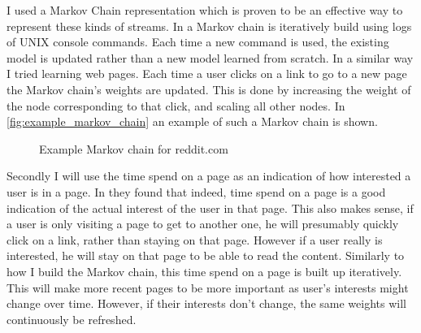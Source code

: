 \documentclass{article}
\begin{document}
I used a Markov Chain representation which is proven to be an effective way to represent these kinds of streams.
In \cite{davison1998predicting} a Markov chain is iteratively build using logs of UNIX console commands.
Each time a new command is used, the existing model is updated rather than a new model learned from scratch.
In a similar way I tried learning web pages.
Each time a user clicks on a link to go to a new page the Markov chain's weights are updated.
This is done by increasing the weight of the node corresponding to that click, and scaling all other nodes.
In \autoref{fig:example_markov_chain} an example of such a Markov chain is shown.

\begin{figure}
    \centering
    \caption{Example Markov chain for reddit.com}
    \label{fig:example_markov_chain}
\end{figure}

Secondly I will use the time spend on a page as an indication of how interested a user is in a page.
In \cite{gunduz2003web} they found that indeed, time spend on a page is a good indication of the actual interest of the user in that page.
This also makes sense, if a user is only visiting a page to get to another one, he will presumably quickly click on a link, rather than staying on that page.
However if a user really is interested, he will stay on that page to be able to read the content.
Similarly to how I build the Markov chain, this time spend on a page is built up iteratively.
This will make more recent pages to be more important as user's interests might change over time.
However, if their interests don't change, the same weights will continuously be refreshed.
\end{document}
